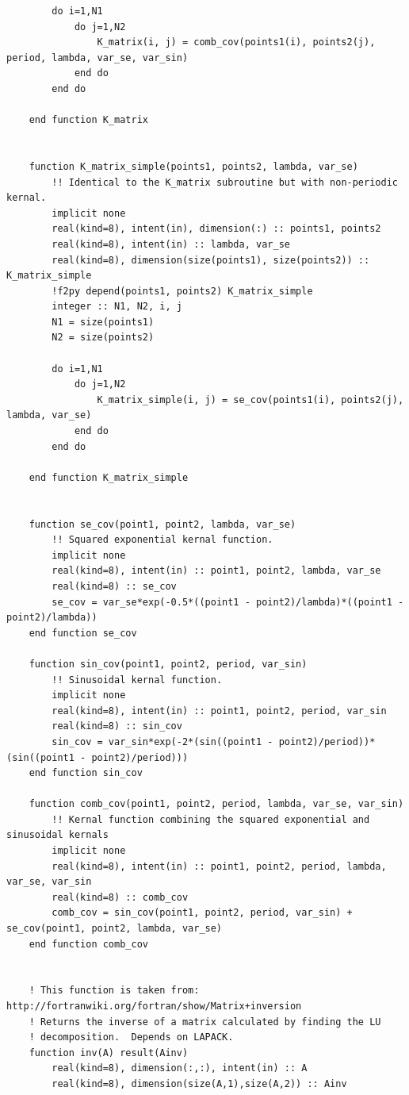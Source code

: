 \documentclass[a4paper]{article}
\begin{document}
\begin{verbatim}
        do i=1,N1
            do j=1,N2
                K_matrix(i, j) = comb_cov(points1(i), points2(j), period, lambda, var_se, var_sin)
            end do
        end do

    end function K_matrix


    function K_matrix_simple(points1, points2, lambda, var_se)
        !! Identical to the K_matrix subroutine but with non-periodic kernal.
        implicit none
        real(kind=8), intent(in), dimension(:) :: points1, points2
        real(kind=8), intent(in) :: lambda, var_se
        real(kind=8), dimension(size(points1), size(points2)) :: K_matrix_simple
        !f2py depend(points1, points2) K_matrix_simple
        integer :: N1, N2, i, j
        N1 = size(points1)
        N2 = size(points2)

        do i=1,N1
            do j=1,N2
                K_matrix_simple(i, j) = se_cov(points1(i), points2(j),  lambda, var_se)
            end do
        end do

    end function K_matrix_simple


    function se_cov(point1, point2, lambda, var_se)
        !! Squared exponential kernal function.
        implicit none
        real(kind=8), intent(in) :: point1, point2, lambda, var_se
        real(kind=8) :: se_cov
        se_cov = var_se*exp(-0.5*((point1 - point2)/lambda)*((point1 - point2)/lambda))
    end function se_cov

    function sin_cov(point1, point2, period, var_sin)
        !! Sinusoidal kernal function.
        implicit none
        real(kind=8), intent(in) :: point1, point2, period, var_sin
        real(kind=8) :: sin_cov
        sin_cov = var_sin*exp(-2*(sin((point1 - point2)/period))*(sin((point1 - point2)/period)))
    end function sin_cov

    function comb_cov(point1, point2, period, lambda, var_se, var_sin)
        !! Kernal function combining the squared exponential and sinusoidal kernals 
        implicit none
        real(kind=8), intent(in) :: point1, point2, period, lambda, var_se, var_sin
        real(kind=8) :: comb_cov
        comb_cov = sin_cov(point1, point2, period, var_sin) + se_cov(point1, point2, lambda, var_se)
    end function comb_cov

    
    ! This function is taken from: http://fortranwiki.org/fortran/show/Matrix+inversion
    ! Returns the inverse of a matrix calculated by finding the LU
    ! decomposition.  Depends on LAPACK. 
    function inv(A) result(Ainv)
        real(kind=8), dimension(:,:), intent(in) :: A
        real(kind=8), dimension(size(A,1),size(A,2)) :: Ainv


\end{verbatim}
\end{document}
